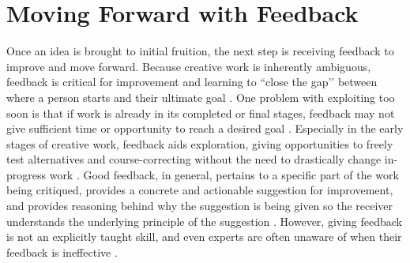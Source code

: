 \section{Moving Forward with Feedback}
Once an idea is brought to initial fruition, the next step is receiving feedback to improve and move forward. Because creative work is inherently ambiguous, feedback is critical for improvement and learning to ``close the gap’’ between where a person starts and their ultimate goal \cite{Gibbs, hattie2012visible,Hattie2007, Nicol2006, sadler1989formative}. One problem with exploiting too soon is that if work is already in its completed or final stages, feedback may not give sufficient time or opportunity to reach a desired goal \cite{Hattie2007,Nicol2006}. Especially in the early stages of creative work, feedback aids exploration, giving opportunities to freely test alternatives and course-correcting without the need to drastically change in-progress work \cite{Dow2010, tohidi2006getting}. Good feedback, in general, pertains to a specific part of the work being critiqued, provides a concrete and actionable suggestion for improvement, and provides reasoning behind why the suggestion is being given so the receiver understands the underlying principle of the suggestion \cite{Gibbs, Hattie2007, Nicol2006, sadler1989formative, sommers1980revision, Stone2015}. However, giving feedback is not an explicitly taught skill, and even experts are often unaware of when their feedback is ineffective \cite{hinds2001, Nicol2006, sommers1980revision}. 


